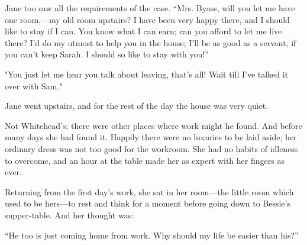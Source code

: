 Jane too saw all the requirements of the case. ``Mrs. Byass, will you
let me have one room,---my old room upstairs? I have been very happy
there, and I should like to stay if I can. You know what I can earn; can
you afford to let me live there? I'd do my utmost to help you in the
house; I'll be as good as a servant, if you can't keep Sarah. I should
so like to stay with you!''

"You just let me hear you talk about {}leaving, that's all! Wait till
I've talked it over with Sam."

Jane went upstairs, and for the rest of the day the house was very
quiet.

Not Whitehead's; there were other places where work might he found. And
before many days she had found it. Happily there were no luxuries to be
laid aside; her ordinary dress was not too good for the workroom. She
had no habits of idleness to overcome, and an hour at the table made her
as expert with her fingers as ever.

Returning from the first day's work, she sat in her room---the little
room which used to be hers---to rest and think for a moment before going
down to Bessie's supper-table. And her thought was:

``He too is just coming home from work. Why should my life be easier
than his?''

